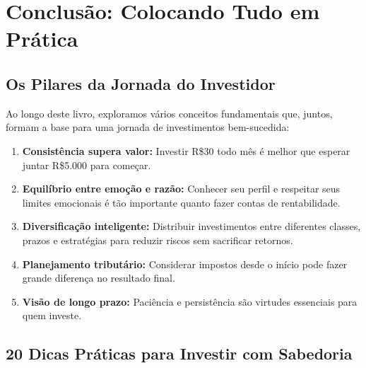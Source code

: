 \chapter{Conclusão: Colocando Tudo em Prática}

\section{Os Pilares da Jornada do Investidor}

\noindent Ao longo deste livro, exploramos vários conceitos fundamentais que, juntos, formam a base para uma jornada de investimentos bem-sucedida:

\begin{enumerate}
    \item \textbf{Consistência supera valor:} Investir R\$30 todo mês é melhor que esperar juntar R\$5.000 para começar.
    
    \item \textbf{Equilíbrio entre emoção e razão:} Conhecer seu perfil e respeitar seus limites emocionais é tão importante quanto fazer contas de rentabilidade.
    
    \item \textbf{Diversificação inteligente:} Distribuir investimentos entre diferentes classes, prazos e estratégias para reduzir riscos sem sacrificar retornos.
    
    \item \textbf{Planejamento tributário:} Considerar impostos desde o início pode fazer grande diferença no resultado final.
    
    \item \textbf{Visão de longo prazo:} Paciência e persistência são virtudes essenciais para quem investe.
\end{enumerate}

\section{20 Dicas Práticas para Investir com Sabedoria}

